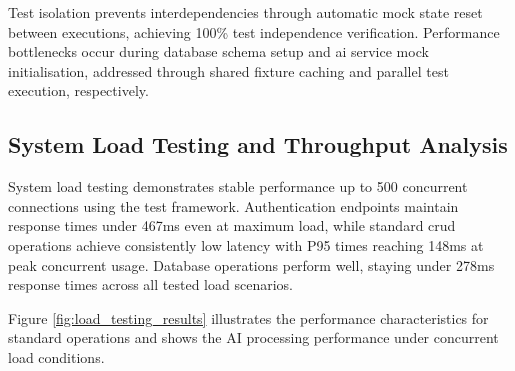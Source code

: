 Test isolation prevents interdependencies through automatic mock state reset between executions, achieving 100\% test independence verification. Performance bottlenecks occur during database schema setup and \ac{ai} service mock initialisation, addressed through shared fixture caching and parallel test execution, respectively.

\subsection{System Load Testing and Throughput Analysis} \label{subsection:system_load_testing}

System load testing demonstrates stable performance up to 500 concurrent connections using the test framework. Authentication endpoints maintain response times under 467ms even at maximum load, while standard \ac{crud} operations achieve consistently low latency with P95 times reaching 148ms at peak concurrent usage. Database operations perform well, staying under 278ms response times across all tested load scenarios.

Figure \ref{fig:load_testing_results} illustrates the performance characteristics for standard operations and shows the AI processing performance under concurrent load conditions.

